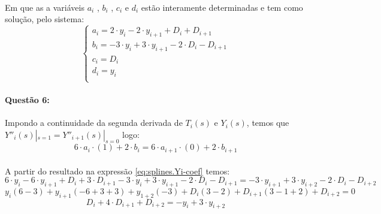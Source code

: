 \documentclass[a4paper,11pt]{article}
\begin{document}
\paragraph{}Em que as a variáveis $a_i$ , $b_i$ , $c_i$ e $d_i$ estão interamente
determinadas e tem como solução, pelo sistema:
\begin{equation}\label{eq:splines.Yi-coef}
\left\{
\begin{array}{l}
a_i=2\cdot y_i - 2\cdot y_{i+1} + D_i + D_{i+1}\\
b_i=-3\cdot y_i +3\cdot y_{i+1} - 2\cdot D_i -D_{i+1}\\
c_i=D_i\\
d_i=y_i\\
\end{array}
\right.
\end{equation}

\paragraph{Questão 6:}Impondo a continuidade da segunda derivada de $T_i(s)$ e $Y_i(s)$,
temos que $Y''_i(s)|_{s=1} = Y''_{i+1}(s)|_{s=0}$ logo:
$$
6\cdot a_i\cdot (1) + 2\cdot b_i 
= 6\cdot a_{i+1}\cdot (0) + 2\cdot b_{i+1}
$$
\paragraph{}A partir do resultado na expressão \ref{eq:splines.Yi-coef} temos:
$$
6\cdot y_i - 6\cdot y_{i+1} + D_i + 3\cdot D_{i+1}
- 3\cdot y_i +3\cdot y_{i+1} - 2\cdot D_i -D_{i+1}
= -3\cdot y_{i+1} +3\cdot y_{i+2} - 2\cdot D_i -D_{i+2}
$$
$$
y_i(6-3) + y_{i+1}(-6+3+3) + y_{1+2}(-3) +
D_i(3-2) + D_{i+1}(3-1+2) + D_{i+2} = 0
$$
\begin{equation}\label{eq:splines.Yi.deriv}
D_i + 4\cdot D_{i+1} + D_{i+2} = -y_i + 3\cdot y_{i+2}
\end{equation}
\end{document}
